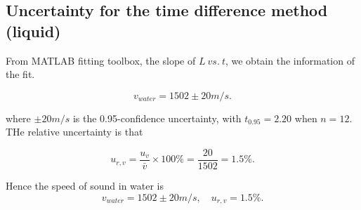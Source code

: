 \subsection{Uncertainty for the time difference method (liquid)}

From MATLAB  fitting toolbox, the slope of $L\ vs.\ t$,
we obtain the information of the fit.  

$$    v_{water}=1502\pm20 m/s. $$

where $\pm 20m/s$ is the 0.95-confidence uncertainty, with $t_{0.95}=2.20$
when $n=12$. THe relative uncertainty is that 

$$u_{r,v}=\frac{u_v}{\bar{v}}\times100\%=\frac{20}{1502}=1.5\%.$$

Hence the speed of sound in water is 
$$v_{water}=1502\pm20m/s,\quad u_{r,v}=1.5\%. $$